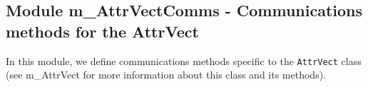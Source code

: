  
\parskip        0pt
\parindent      0pt
\baselineskip  11pt
 
\def\bv{\begin{verbatim}}
\def\ev{\end{verbatim}}
\def\be{\begin{equation}}
\def\ee{\end{equation}}
\def\bea{\begin{eqnarray}}
\def\eea{\end{eqnarray}}
\def\bi{\begin{itemize}}
\def\ei{\end{itemize}}
\def\bn{\begin{enumerate}}
\def\en{\end{enumerate}}
\def\bd{\begin{description}}
\def\ed{\end{description}}
\def\({\left (}
\def\){\right )}
\def\[{\left [}
\def\]{\right ]}
\def\<{\left  \langle}
\def\>{\right \rangle}
\def\cI{{\cal I}}
\def\diag{\mathop{\rm diag}}
\def\tr{\mathop{\rm tr}}
 

 \subsection{Module m\_AttrVectComms - Communications methods for the AttrVect}


 
 
  In this module, we define communications methods specific to the 
  {\tt AttrVect} class (see m\_AttrVect for more information about this
  class and its methods).
 
